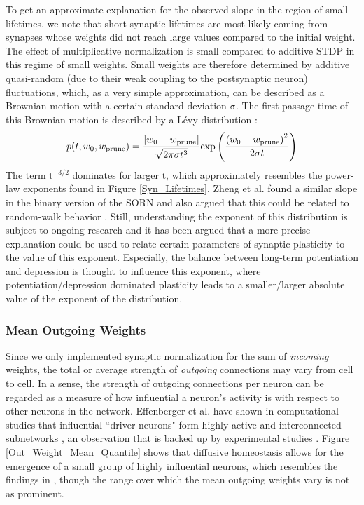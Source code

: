 \documentclass[10pt,a4paper]{article}
\begin{document}
To get an approximate explanation for the observed slope in the region of small lifetimes, we note that short synaptic lifetimes are most likely coming from synapses whose weights did not reach large values compared to the initial weight. The effect of multiplicative normalization is small compared to additive STDP in this regime of small weights. Small weights are therefore determined by additive quasi-random (due to their weak coupling to the postsynaptic neuron) fluctuations, which, as a very simple approximation, can be described as a Brownian motion with a certain standard deviation $\mathrm{\sigma}$. The first-passage time of this Brownian motion is described by a Lévy distribution \cite{Roy_1968}:
\begin{equation}
p(t,w_0,w_{\rm prune}) = \frac{ | w_0-w_{\rm prune}|}{\sqrt{2\pi \sigma t^3}} \mathrm{exp} \left( \frac{ \left( w_0-w_{\rm prune} \right) ^2}{2\sigma t}\right)
\label{Levy_Dist}
\end{equation}
The term $\mathrm{t^{-3/2}}$ dominates for larger $\mathrm{t}$, which approximately resembles the power-law exponents found in Figure \ref{Syn_Lifetimes}. Zheng et al. found a similar slope in the binary version of the SORN and also argued that this could be related to random-walk behavior \cite{Pengsheng_2013}. Still, understanding the exponent of this distribution is subject to ongoing research and it has been argued that a more precise explanation could be used to relate certain parameters of synaptic plasticity to the value of this exponent. Especially, the balance between long-term potentiation and depression is thought to influence this exponent, where potentiation/depression dominated plasticity leads to a smaller/larger absolute value of the exponent of the distribution.

\subsubsection{Mean Outgoing Weights}\label{Section_Mean_outgoing_Weights}
Since we only implemented synaptic normalization for the sum of \emph{incoming} weights, the total or average strength of \emph{outgoing} connections may vary from cell to cell. In a sense, the strength of outgoing connections per neuron can be regarded as a measure of how influential a neuron's activity is with respect to other neurons in the network. Effenberger et al. have shown in computational studies that influential ``driver neurons" form highly active and interconnected subnetworks \cite{Effenberger_2015}, an observation that is backed up by experimental studies \cite{Yassin_Subnetworks_2010,Eckmann_Leader_Neurons_2008}. Figure \ref{Out_Weight_Mean_Quantile} shows that diffusive homeostasis allows for the emergence of a small group of highly influential neurons, which resembles the findings in \cite{Effenberger_2015}, though the range over which the mean outgoing weights vary is not as prominent.
\end{document}
